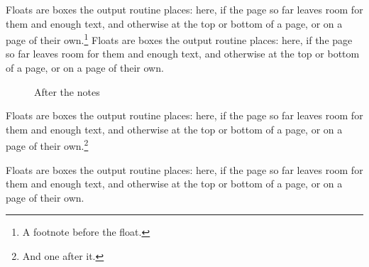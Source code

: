 \documentclass[12pt]{report}
\begin{document}
Floats are boxes the output routine places: here, if the page so far leaves room for them and enough text, and otherwise at the top or bottom of a page, or on a page of their own.\footnote{A footnote before the float.} Floats are boxes the output routine places: here, if the page so far leaves room for them and enough text, and otherwise at the top or bottom of a page, or on a page of their own.

\begin{figure}[htbp]
\centering
\caption{After the notes}
\end{figure}

Floats are boxes the output routine places: here, if the page so far leaves room for them and enough text, and otherwise at the top or bottom of a page, or on a page of their own.\footnote{And one after it.}

Floats are boxes the output routine places: here, if the page so far leaves room for them and enough text, and otherwise at the top or bottom of a page, or on a page of their own.
\end{document}
